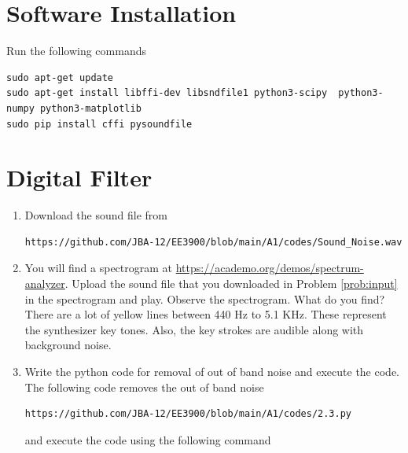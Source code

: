 \documentclass[journal,12pt,twocolumn]{IEEEtran}
\renewcommand\thesection{\arabic{section}}
\begin{document}
\section{Software Installation}
Run the following commands
\begin{lstlisting}
sudo apt-get update
sudo apt-get install libffi-dev libsndfile1 python3-scipy  python3-numpy python3-matplotlib 
sudo pip install cffi pysoundfile 
\end{lstlisting}
\section{Digital Filter}
\begin{enumerate}[label=\thesection.\arabic*
,ref=\thesection.\theenumi]
\item
\label{prob:input}
Download the sound file from  
\begin{lstlisting}
https://github.com/JBA-12/EE3900/blob/main/A1/codes/Sound_Noise.wav
\end{lstlisting}
\item
\label{prob:spectrogram}
You will find a spectrogram at \href{https://academo.org/demos/spectrum-analyzer}{\url{https://academo.org/demos/spectrum-analyzer}}. 
%
Upload the sound file that you downloaded in Problem \ref{prob:input} in the spectrogram  and play.  Observe the spectrogram. What do you find?
\\
%
\solution There are a lot of yellow lines between 440 Hz to 5.1 KHz.  These represent the synthesizer key tones. Also, the key strokes
are audible along with background noise.
\item
\label{prob:output}
Write the python code for removal of out of band noise and execute the code.
\\
\solution The following code removes the out of band noise
\begin{lstlisting}
https://github.com/JBA-12/EE3900/blob/main/A1/codes/2.3.py
\end{lstlisting}
and execute the code using the following command
\begin{lstlisting}

\end{lstlisting}
\end{enumerate}
\end{document}
